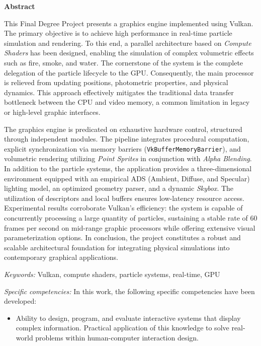 \begin{center}
    \textbf{Abstract}
\end{center}

\noindent This Final Degree Project presents a graphics engine implemented using Vulkan. The primary objective is to achieve high performance in real-time particle simulation and rendering. To this end, a parallel architecture based on \textit{Compute Shaders} has been designed, enabling the simulation of complex volumetric effects such as fire, smoke, and water. The cornerstone of the system is the complete delegation of the particle lifecycle to the GPU. Consequently, the main processor is relieved from updating positions, photometric properties, and physical dynamics. This approach effectively mitigates the traditional data transfer bottleneck between the CPU and video memory, a common limitation in legacy or high-level graphic interfaces.

The graphics engine is predicated on exhaustive hardware control, structured through independent modules. The pipeline integrates procedural computation, explicit synchronization via memory barriers (\texttt{VkBufferMemoryBarrier}), and volumetric rendering utilizing \textit{Point Sprites} in conjunction with \textit{Alpha Blending}. In addition to the particle systems, the application provides a three-dimensional environment equipped with an empirical ADS (Ambient, Diffuse, and Specular) lighting model, an optimized geometry parser, and a dynamic \textit{Skybox}. The utilization of descriptors and local buffers ensures low-latency resource access. Experimental results corroborate Vulkan's efficiency: the system is capable of concurrently processing a large quantity of particles, sustaining a stable rate of 60 frames per second on mid-range graphic processors while offering extensive visual parameterization options. In conclusion, the project constitutes a robust and scalable architectural foundation for integrating physical simulations into contemporary graphical applications.

\vspace{0.5cm}
\textit{Keywords:} Vulkan, compute shaders, particle systems, real-time, GPU

\vspace{0.5cm}
\textit{Specific competencies:} 
In this work, the following specific competencies have been developed:
\begin{itemize}
    \item Ability to design, program, and evaluate interactive systems that display complex information. Practical application of this knowledge to solve real-world problems within human-computer interaction design.
\end{itemize}